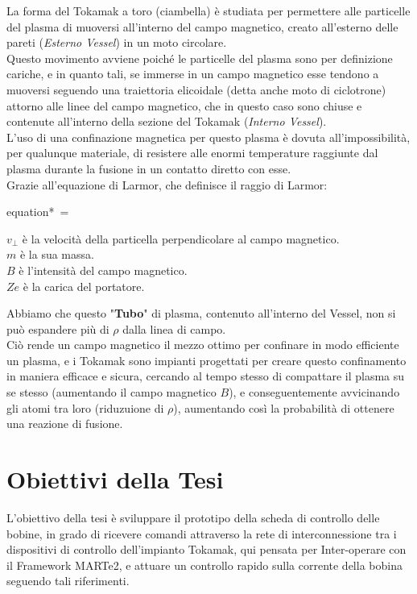 \noindent
La forma del Tokamak a toro (ciambella) è studiata per permettere alle particelle del plasma di muoversi all'interno del campo magnetico, creato all'esterno delle pareti (\textit{Esterno Vessel}) in un moto circolare.\\
Questo movimento avviene poiché le particelle del plasma sono per definizione cariche, e in quanto tali, se immerse in un campo magnetico esse tendono a muoversi seguendo una traiettoria elicoidale (detta anche moto di ciclotrone) attorno alle linee del campo magnetico, che in questo caso sono chiuse e contenute all'interno della sezione del Tokamak (\textit{Interno Vessel}).\\
L'uso di una confinazione magnetica per questo plasma è dovuta all'impossibilità, per qualunque materiale, di resistere alle enormi temperature raggiunte dal plasma durante la fusione in un contatto diretto con esse.\\
Grazie all'equazione di Larmor, che definisce il raggio di Larmor:\\
\begin{vwcol}[widths={0.3,0.7}, sep=8mm, rule=1px] 
		\begin{empheq}[box=\mathCalc]{equation*} \label{eq:Larmor}
		{\displaystyle \,\rho ={}}
	\end{empheq}
\newpage %
	\begin{spacing}{1.25}
		{\footnotesize 
			$ {\displaystyle v_{\perp }} $ è la velocità della particella perpendicolare al campo magnetico.\\
			$ {\displaystyle m} $ è la sua massa.\\
			$ {\displaystyle B} $ è l'intensità del campo magnetico.\\
			$ {\displaystyle Ze} $ è la carica del portatore.
		}
	\end{spacing}
\end{vwcol}

\noindent
Abbiamo che questo "\textbf{Tubo}" di plasma, contenuto all'interno del Vessel, non si può espandere più di $ {\displaystyle \rho } $ dalla linea di campo.\\
Ciò rende un campo magnetico il mezzo ottimo per confinare in modo efficiente un plasma, e i Tokamak sono impianti progettati per creare questo confinamento in maniera efficace e sicura, cercando al tempo stesso di compattare il plasma su se stesso (aumentando il campo magnetico $ {\displaystyle B} $), e conseguentemente avvicinando gli atomi tra loro (riduzuione di $ {\displaystyle \rho } $), aumentando così la probabilità di ottenere una reazione di fusione. 

\section*{Obiettivi della Tesi}
L'obiettivo della tesi è sviluppare il prototipo della scheda di controllo delle bobine, in grado di ricevere comandi attraverso la rete di interconnessione tra i dispositivi di controllo dell'impianto Tokamak, qui pensata per Inter-operare con il Framework MARTe2, e attuare un controllo rapido sulla corrente della bobina seguendo tali riferimenti.\\